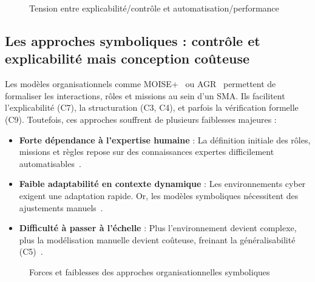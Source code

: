 \documentclass[ twoside,openright,titlepage,numbers=noenddot,headinclude,%
                footinclude=true,cleardoublepage=empty,abstractoff, %
                BCOR=5mm,paper=a4,fontsize=11pt,%
                french,american,%
                ]{scrreprt}
\begin{document}
\begin{figure}[H]
    \centering
    \caption{Tension entre explicabilité/contrôle et automatisation/performance}
    \label{fig:limits_tradeoff}
\end{figure}

\subsection{Les approches symboliques : contrôle et explicabilité mais conception coûteuse}

Les modèles organisationnels comme MOISE+~\cite{Hubner2002} ou AGR~\cite{Ferber2003} permettent de formaliser les interactions, rôles et missions au sein d'un SMA. Ils facilitent l'explicabilité (C7), la structuration (C3, C4), et parfois la vérification formelle (C9). Toutefois, ces approches souffrent de plusieurs faiblesses majeures :

\begin{itemize}
    \item \textbf{Forte dépendance à l'expertise humaine} : La définition initiale des rôles, missions et règles repose sur des connaissances expertes difficilement automatisables~\cite{Boella2008}.
    \item \textbf{Faible adaptabilité en contexte dynamique} : Les environnements cyber exigent une adaptation rapide. Or, les modèles symboliques nécessitent des ajustements manuels~\cite{Picard2005}.
    \item \textbf{Difficulté à passer à l'échelle} : Plus l'environnement devient complexe, plus la modélisation manuelle devient coûteuse, freinant la généralisabilité (C5)~\cite{Picard2006}.
\end{itemize}

\begin{figure}[H]
    \centering
    \caption{Forces et faiblesses des approches organisationnelles symboliques}
    \label{fig:limits_symbolic}
\end{figure}
\end{document}
